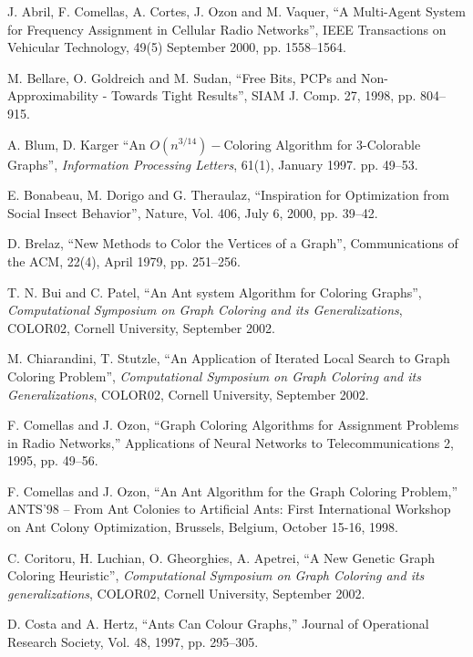 \documentclass[11pt]{article}
\begin{document}
\begin{thebibliography}{99} 

J. Abril, F. Comellas, A. Cortes, J. Ozon and M. Vaquer,
``A Multi-Agent System for Frequency Assignment in Cellular Radio
Networks'',
IEEE Transactions on Vehicular Technology,  49(5) September 2000, pp.
1558--1564.


M. Bellare, O. Goldreich and M. Sudan,
``Free Bits, PCPs and Non-Approximability - Towards Tight Results'',
SIAM J. Comp. 27, 1998, pp. 804--915.

A. Blum, D. Karger
``An $O(n^{3/14})-$Coloring Algorithm for 3-Colorable Graphs'',
{\it Information Processing Letters}, 61(1), January 1997. pp. 49--53.

E. Bonabeau, M. Dorigo and G. Theraulaz,
``Inspiration for Optimization from Social Insect Behavior'',
Nature, Vol. 406, July 6, 2000, pp. 39--42.


D. Brelaz,
``New Methods to Color the Vertices of a Graph'',
Communications of the ACM, 22(4),  April 1979, pp. 251--256.

T. N. Bui and C. Patel,
``An Ant system Algorithm for Coloring Graphs'',
{\it Computational Symposium on Graph Coloring and its Generalizations}, 
COLOR02,
Cornell University, September 2002.

M. Chiarandini, T. Stutzle,
``An Application of Iterated Local Search to Graph Coloring Problem'',
{\it Computational Symposium on Graph Coloring and its Generalizations}, 
COLOR02,
Cornell University, September 2002.


F. Comellas and J. Ozon,
``Graph Coloring Algorithms for Assignment Problems in Radio Networks,''
Applications of Neural Networks to Telecommunications 2, 1995, pp.
49--56.


F. Comellas and J. Ozon,
``An Ant Algorithm for the Graph Coloring Problem,''
ANTS'98 -- From Ant Colonies to Artificial Ants: First International 
Workshop on Ant Colony Optimization, Brussels, Belgium, October 15-16, 1998.

C. Coritoru, H. Luchian, O. Gheorghies, A. Apetrei,
``A New Genetic Graph Coloring Heuristic'',
{\it Computational Symposium on Graph Coloring and its generalizations}, 
COLOR02,
Cornell University, September 2002.

D. Costa and A. Hertz,
``Ants Can Colour Graphs,''
Journal of Operational Research Society,  Vol. 48, 1997, pp. 295--305.


\end{thebibliography}
\end{document}
